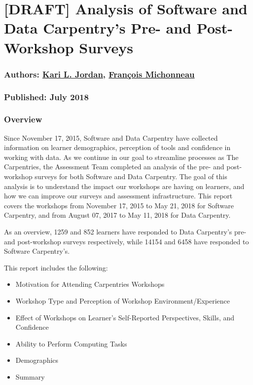 \documentclass[]{article}
\title{}
\author{}
\date{}
\providecommand{\tightlist}{%
  \setlength{\itemsep}{0pt}\setlength{\parskip}{0pt}}
\begin{document}
\section{{[}DRAFT{]} Analysis of Software and Data Carpentry's Pre- and
Post-Workshop
Surveys}\label{draft-analysis-of-software-and-data-carpentrys-pre--and-post-workshop-surveys}

\subsubsection{\texorpdfstring{Authors:
\href{https://twitter.com/drkariljordan}{Kari L. Jordan},
\href{https://twitter.com/fmic_}{François
Michonneau}}{Authors: Kari L. Jordan, François Michonneau}}\label{authors-kari-l.-jordan-francois-michonneau}

\subsubsection{Published: July 2018}\label{published-july-2018}

\subsubsection{Overview}\label{overview}

Since November 17, 2015, Software and Data Carpentry have collected
information on learner demographics, perception of tools and confidence
in working with data. As we continue in our goal to streamline processes
as The Carpentries, the Assessment Team completed an analysis of the
pre- and post-workshop surveys for both Software and Data Carpentry. The
goal of this analysis is to understand the impact our workshops are
having on learners, and how we can improve our surveys and assessment
infrastructure. This report covers the workshops from November 17, 2015
to May 21, 2018 for Software Carpentry, and from August 07, 2017 to May
11, 2018 for Data Carpentry.

As an overview, 1259 and 852 learners have responded to Data Carpentry's
pre- and post-workshop surveys respectively, while 14154 and 6458 have
responded to Software Carpentry's.

This report includes the following:

\begin{itemize}
\tightlist
\item
  Motivation for Attending Carpentries Workshops
\item
  Workshop Type and Perception of Workshop Environment/Experience
\item
  Effect of Workshops on Learner's Self-Reported Perspectives, Skills,
  and Confidence
\item
  Ability to Perform Computing Tasks
\item
  Demographics
\item
  Summary
\end{itemize}
\end{document}
